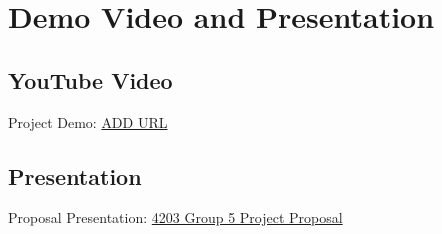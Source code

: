 \section{Demo Video and Presentation}

\subsection{YouTube Video}
Project Demo: {\color{blue}\href{<ADD URL>}{ADD URL}}

\subsection{Presentation}
Proposal Presentation: {\color{blue}\href{https://youtu.be/NOwZpC8iaG8}{4203 Group 5 Project Proposal}}